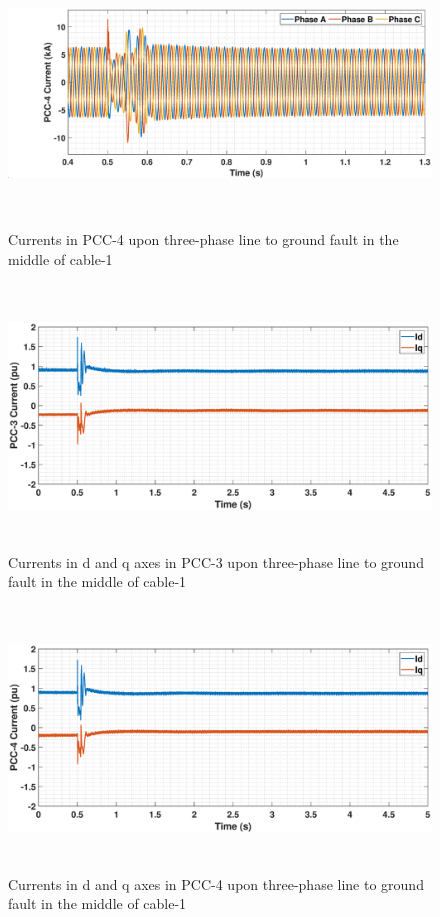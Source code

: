 \begin{figure}[H]
    \includegraphics[height = 7cm,width = \textwidth]{Diagrams/Appendix_C/IABC_WT4_3phaseSC.eps}
    \caption{Currents in PCC-4 upon three-phase line to ground fault in the middle of cable-1}
    \label{IABC_WT4_3phaseSC}
\end{figure}

\begin{figure}[H]
    \includegraphics[height = 7cm,width = \textwidth]{Diagrams/Appendix_C/IDQ_WT3_3phaseSC.eps}
    \caption{Currents in d and q axes in PCC-3 upon three-phase line to ground fault in the middle of cable-1}
    \label{IDQ_WT3_3phaseSC}
\end{figure}

\begin{figure}[H]
    \includegraphics[height = 7cm,width = \textwidth]{Diagrams/Appendix_C/IDQ_WT4_3phaseSC.eps}
    \caption{Currents in d and q axes in PCC-4 upon three-phase line to ground fault in the middle of cable-1}
    \label{IDQ_WT4_3phaseSC}
\end{figure}
